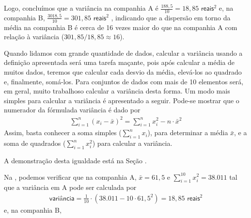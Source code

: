 Logo, concluímos que a variância na companhia A é \(\frac{188,5}{10}=18,85\textsf{ reais}^2\) e, na companhia B, \(\frac{3018,5}{10}=301,85\textsf{ reais}^2\) , indicando que a dispersão em torno da média na companhia B é cerca de 16 vezes maior do que na companhia A com relação à variância  (\(301,85/18,85\approx 16\)).

Quando lidamos com grande quantidade de dados, calcular a variância usando a definição apresentada será uma tarefa maçante, pois após calcular a média de muitos dados, teremos que calcular cada desvio da média, elevá-los ao quadrado e, finalmente, somá-los. Para conjuntos de dados com  mais de 10 elementos será, em geral, muito trabalhoso calcular a variância desta forma. Um modo mais simples para calcular a variância é apresentado a seguir.  Pode-se mostrar que o numerador da fórmulada variância é dado por
\begin{equation*}
\begin{split}\sum^n_{i=1} (x_i-\bar{x})^2 = \sum^n_{i=1} x^2_i-n\cdot \bar{x}^2\end{split}
\end{equation*}
Assim, basta conhecer a soma simples (\(\displaystyle{\sum^n_{i=1}}x_i\)), para determinar a média \(\bar{x}\), e a soma de quadrados (\(\displaystyle{\sum^n_{i=1}}x^2_i\)) para calcular a variância.

A demonstração desta igualdade está na Seção {\hyperref[\detokenize{PE104-A:sec-para-saber-mais}]{}}.

Na  , podemos verificar que na companhia A, \(\bar{x}=61,5\) e \(\displaystyle{\sum^{10}_{i=1}} x^2_i=38.011\) tal que a variância em A pode ser calculada por
\begin{equation*}
\begin{split}\textsf{variância}=\frac{1}{10}\cdot (38.011-10\cdot 61,5^2)=18,85\textsf{ reais}^2\end{split}
\end{equation*}
e, na companhia B,

